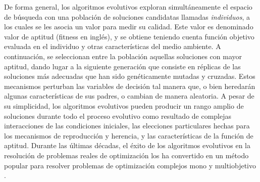 De forma general, los algoritmos evolutivos exploran simultáneamente el espacio de búsqueda con una población de soluciones candidatas llamadas \textit{individuos}, a los cuales se les asocia un valor para medir su calidad. Este valor es denominado valor de aptitud (fitness en inglés), y se obtiene teniendo cuenta función objetivo evaluada en el individuo y otras características del medio ambiente. A continuación, se seleccionan entre la población aquellas soluciones con mayor aptitud, dando lugar a la siguiente generación que consiste en réplicas de las soluciones más adecuadas que han sido genéticamente mutadas y cruzadas. Estos mecanismos perturban las variables de decisión tal manera que, o bien heredarán algunas características de sus padres, o cambian de manera aleatoria. A pesar de su simplicidad, los algoritmos evolutivos pueden producir un rango amplio de soluciones durante todo el proceso evolutivo como resultado de complejas interacciones de las condiciones iniciales, las elecciones particulares hechas para los mecanismos de reproducción y herencia, y las características de la función de aptitud. Durante las últimas décadas, el éxito de los algoritmos evolutivos en la resolución de problemas reales de optimización los ha convertido en un método popular para resolver problemas de optimización complejos mono y multiobjetivo \cite{deb2001multi}.

